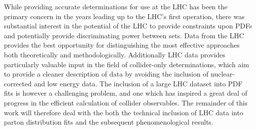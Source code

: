 While providing accurate determinations for use at the LHC has been the primary concern in the years leading up to the LHC's first operation, there was substantial interest in the potential of the LHC to provide constraints upon PDFs and potentially provide discriminating power between sets. Data from the LHC provides the best opportunity for distinguishing the most effective approaches both theoretically and methodologically. Additionally LHC data provides particularly valuable input in the field of collider-only determinations, which aim to provide a cleaner description of data by avoiding the inclusion of nuclear-corrected and low energy data. The inclusion of a large LHC dataset into PDF fits is however a challenging problem, and one which has inspired a great deal of progress in the efficient calculation of collider observables. The remainder of this work will therefore deal with the both the technical inclusion of LHC data into parton distribution fits and the subsequent phenomenological results.


